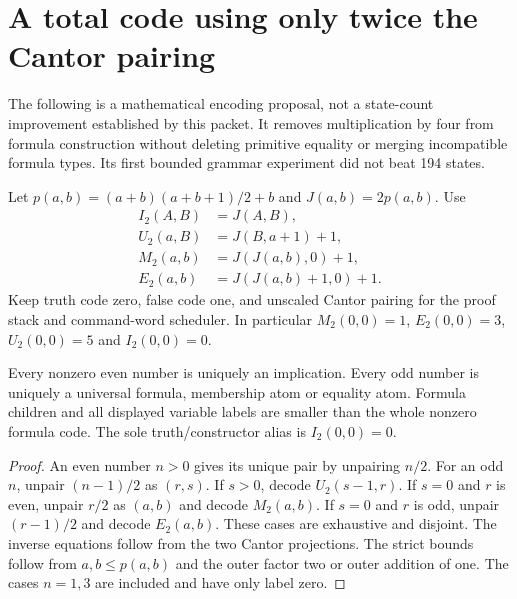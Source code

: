 \section{A total code using only twice the Cantor pairing}
\label{sec:nested-code}

The following is a mathematical encoding proposal, not a state-count
improvement established by this packet.  It removes multiplication by four
from formula construction without deleting primitive equality or merging
incompatible formula types.  Its first bounded grammar experiment did not
beat 194 states.

Let $p(a,b)=(a+b)(a+b+1)/2+b$ and $J(a,b)=2p(a,b)$.  Use
\begin{align*}
 I_2(A,B)&=J(A,B),\\
 U_2(a,B)&=J(B,a+1)+1,\\
 M_2(a,b)&=J(J(a,b),0)+1,\\
 E_2(a,b)&=J(J(a,b)+1,0)+1.
\end{align*}
Keep truth code zero, false code one, and unscaled Cantor pairing for the
proof stack and command-word scheduler.  In particular
$M_2(0,0)=1$, $E_2(0,0)=3$, $U_2(0,0)=5$ and $I_2(0,0)=0$.

\begin{lemma}
Every nonzero even number is uniquely an implication.  Every odd number
is uniquely a universal formula, membership atom or equality atom.
Formula children and all displayed variable labels are smaller than the
whole nonzero formula code.  The sole truth/constructor alias is
$I_2(0,0)=0$.
\end{lemma}
\begin{proof}
An even number $n>0$ gives its unique pair by unpairing $n/2$.
For an odd $n$, unpair $(n-1)/2$ as $(r,s)$.
If $s>0$, decode $U_2(s-1,r)$.  If $s=0$ and $r$ is even, unpair
$r/2$ as $(a,b)$ and decode $M_2(a,b)$.  If $s=0$ and $r$ is odd,
unpair $(r-1)/2$ and decode $E_2(a,b)$.  These cases are exhaustive
and disjoint.  The inverse equations follow from the two Cantor
projections.  The strict bounds follow from $a,b\le p(a,b)$ and
the outer factor two or outer addition of one.  The cases $n=1,3$
are included and have only label zero.
\end{proof}

